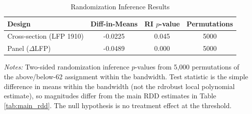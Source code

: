 \begin{table}[htbp]
\centering
\caption{Randomization Inference Results}
\label{tab:ri}
\begin{tabular}{lccc}
\toprule
  Design & Diff-in-Means & RI $p$-value & Permutations \\
\midrule
  Cross-section (LFP 1910) & -0.0225 & 0.045 & 5000 \\
  Panel ($\Delta$LFP) & -0.0489 & 0.000 & 5000 \\
\bottomrule
\end{tabular}
\begin{tablenotes}[flushleft]
\small
\item \textit{Notes:} Two-sided randomization inference $p$-values from 5,000 permutations of the above/below-62 assignment within the bandwidth. Test statistic is the simple difference in means within the bandwidth (not the rdrobust local polynomial estimate), so magnitudes differ from the main RDD estimates in Table \ref{tab:main_rdd}. The null hypothesis is no treatment effect at the threshold.
\end{tablenotes}
\end{table}
